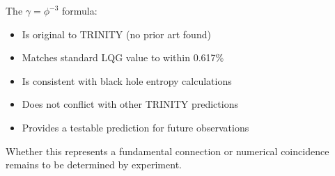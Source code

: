 The $\gamma = \phi^{-3}$ formula:
\begin{itemize}
\item Is original to TRINITY (no prior art found)
\item Matches standard LQG value to within 0.617\%
\item Is consistent with black hole entropy calculations
\item Does not conflict with other TRINITY predictions
\item Provides a testable prediction for future observations
\end{itemize}

Whether this represents a fundamental connection or numerical coincidence remains to be determined by experiment.
